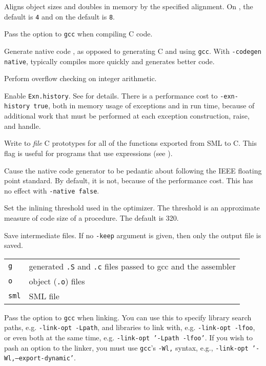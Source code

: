 \begin{description}

Aligns object sizes and doubles in memory by the specified alignment.
On {\intel}, the default is {\tt 4} and on {\sparc} the default is
{\tt 8}.

Pass the option to {\tt gcc} when compiling C code.

Generate native code , as opposed to generating C and using {\tt gcc}.
With {\tt -codegen native}, {\mlton} typically compiles more quickly and
generates better code.

Perform overflow checking on integer arithmetic.

Enable {\tt Exn.history}.  See  for details.  There is a
performance cost to {\tt -exn-history true}, both in memory usage of
exceptions and in run time, because of additional work that must be
performed at each exception construction, raise, and handle.

Write to {\it file} C prototypes for all of the functions exported
from SML to C.  This flag is useful for programs that use {\export}
expressions (see ).

Cause the native code generator to be pedantic about following the
IEEE floating point standard.  By default, it is not, because of the
performance cost.  This has no effect with {\tt -native false}.

Set the inlining threshold used in the optimizer.  The threshold is an
approximate measure of code size of a procedure.  The default is 320.

Save intermediate files.  If no {\tt -keep} argument is given, then
only the output file is saved.\\
\hspace*{0.5in}
\begin{tabular}{l|l}
\hline
{\tt g} & generated {\tt .S} and {\tt .c} files passed to gcc and the assembler\\
{\tt o} & object ({\tt .o}) files\\
{\tt sml} & SML file\\
\end{tabular}

Pass the option to {\tt gcc} when linking.  You can use this to
specify library search paths, e.g. {\tt -link-opt -Lpath}, and
libraries to link with, e.g. {\tt -link-opt -lfoo}, or even both at
the same time, e.g. {\tt -link-opt '-Lpath -lfoo'}.  If you wish to
pash an option to the linker, you must use {\tt gcc}'s {\tt -Wl,}
syntax, e.g., {\tt -link-opt '-Wl,--export-dynamic'}.


\end{description}
